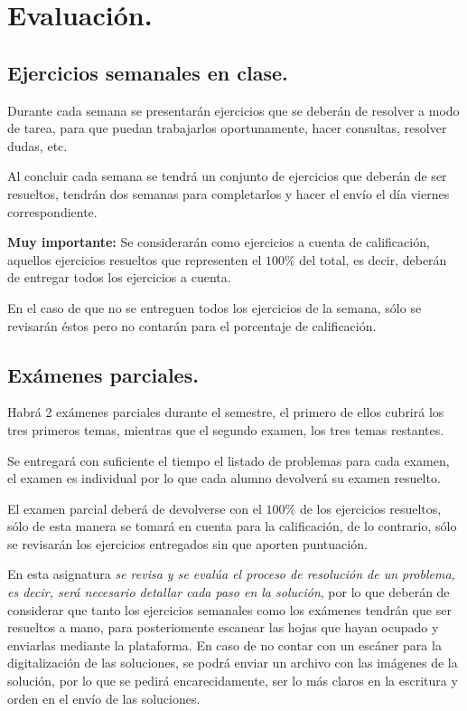\documentclass[12pt]{article}
\begin{document}
\section{Evaluación.}
\subsection{Ejercicios semanales en clase.}

Durante cada semana se presentarán ejercicios que se deberán de resolver a modo de tarea, para que puedan trabajarlos oportunamente, hacer consultas, resolver dudas, etc.
\par
Al concluir cada semana se tendrá un conjunto de ejercicios que deberán de ser resueltos, tendrán dos semanas para completarlos y hacer el envío el día viernes correspondiente.
\par
\textbf{Muy importante: } Se considerarán como ejercicios a cuenta de calificación, aquellos ejercicios resueltos que representen el $100\%$ del total, es decir, deberán de entregar todos los ejercicios a cuenta.
\par
En el caso de que no se entreguen todos los ejercicios de la semana, sólo se revisarán éstos pero no contarán para el porcentaje de calificación.
\subsection{Exámenes parciales.}

Habrá 2 exámenes parciales durante el semestre, el primero de ellos cubrirá los tres primeros temas, mientras que el segundo examen, los tres temas restantes.
\par
Se entregará con suficiente el tiempo el listado de problemas para cada examen, el examen es individual por lo que cada alumno devolverá su examen resuelto.
\par
El examen parcial deberá de devolverse con el $100\%$ de los ejercicios resueltos, sólo de esta manera se tomará en cuenta para la calificación, de lo contrario, sólo se revisarán los ejercicios entregados sin que aporten puntuación.
\par
En esta asignatura \emph{se revisa y se evalúa el proceso de resolución de un problema, es decir, será necesario detallar cada paso en la solución}, por lo que deberán de considerar que tanto los ejercicios semanales como los exámenes tendrán que ser resueltos a mano, para posteriomente escanear las hojas que hayan ocupado y enviarlas mediante la plataforma. En caso de no contar con un escáner para la digitalización de las soluciones, se podrá enviar un archivo con las imágenes de la solución, por lo que se pedirá encarecidamente, ser lo más claros en la escritura y orden en el envío de las soluciones.
\end{document}
